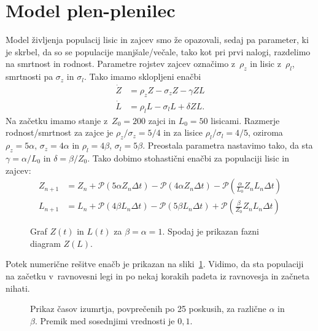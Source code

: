 \documentclass[a4paper,pdftex,11pt]{article}
\numberwithin{figure}{section} %
\begin{document}
\section{Model plen-plenilec}
Model življenja populacij lisic in zajcev smo že opazovali, sedaj pa parameter, ki je 
skrbel, da so se populacije manjšale/večale, tako kot pri prvi nalogi, razdelimo na smrtnost
in rodnost. Parametre rojstev zajcev označimo z~$\rho_z$ in lisic z~$\rho_l$, smrtnosti 
pa $\sigma_z$ in $\sigma_l$. Tako imamo sklopljeni enačbi
\begin{align}
    \dot{Z} &= \rho_z Z - \sigma_z Z - \gamma Z L \\
    \dot{L} &= \rho_l L - \sigma_l L + \delta Z L.
\end{align}
Na začetku imamo stanje z~$Z_0=200$ zajci in $L_0=50$ lisicami. Razmerje rodnost/smrtnost
za zajce je $\rho_z/\sigma_z = 5/4$ in za lisice $\rho_l/\sigma_l = 4/5$, oziroma
$\rho_z = 5\alpha, \, \sigma_z = 4\alpha$ in $\rho_l = 4\beta, \, \sigma_l = 5\beta$. 
Preostala parametra nastavimo tako, da sta $\gamma = \alpha /L_0$ in $\delta = \beta/Z_0$.
Tako dobimo stohastični enačbi za populaciji lisic in zajcev:
\begin{align}
    Z_{n+1} &= Z_{n} + \mathcal{P}(5 \alpha Z_n \Delta t) - \mathcal{P}(4 \alpha Z_n 
    \Delta t) - \mathcal{P}( \frac{\alpha}{L_0} Z_n L_n \Delta t) \\
    L_{n+1} &= L_{n} + \mathcal{P}(4 \beta L_n \Delta t) - \mathcal{P}(5 \beta L_n 
    \Delta t) + \mathcal{P}( \frac{\beta}{Z_0} Z_n L_n \Delta t)
\end{align}

\begin{figure}    
    \begin{minipage}{\textwidth} 
	\centering 
	\resizebox{0.75\textwidth}{!}{} 
    \end{minipage}
    \begin{minipage}{\textwidth} 
	\centering
	\resizebox{0.75\textwidth}{!}{} 
    \end{minipage}
    \caption{Graf $Z(t)$ in $L(t)$ za $\beta=\alpha=1$. Spodaj je prikazan fazni diagram
    $Z(L)$.}
    \label{slika8}
\end{figure}
Potek numerične rešitve enačb je prikazan na sliki~\ref{slika8}. Vidimo, da sta populaciji
na začetku v~ravnovesni legi in po nekaj korakih padeta iz ravnovesja in začneta nihati.

\begin{figure}    
    \centering
    \resizebox{0.75\linewidth}{!}{}
    \caption{Prikaz časov izumrtja, povprečenih po 25 poskusih, za različne $\alpha$ in
    $\beta$. Premik med sosednjimi vrednosti je $0,1$.}
    \label{slika9}
\end{figure}
\end{document}
